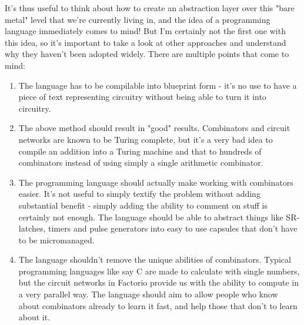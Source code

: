 \documentclass[landscape]{article}
\theoremstyle{plain}
\theoremstyle{definition}
\begin{document}
It's thus useful to think about how to create an abstraction layer over this "bare metal" level that we're currently living in, and the idea of a programming language immediately comes to mind! But I'm certainly not the first one with this idea, so it's important to take a look at other approaches and understand why they haven't been adopted widely. There are multiple points that come to mind:
\begin{enumerate}
	\item The language has to be compilable into blueprint form - it's no use to have a piece of text representing circuitry without being able to turn it into circuitry.
	\item The above method should result in "good" results. Combinators and circuit networks are known to be Turing complete, but it's a very bad idea to compile an addition into a Turing machine and that to hundreds of combinators instead of using simply a single arithmetic combinator.
	\item The programming language should actually make working with combinators easier. It's not useful to simply textify the problem without adding substantial benefit - simply adding the ability to comment on stuff is certainly not enough. The language should be able to abstract things like SR-latches, timers and pulse generators into easy to use capsules that don't have to be micromanaged.
	\item The language shouldn't remove the unique abilities of combinators. Typical programming languages like say C are made to calculate with single numbers, but the circuit networks in Factorio provide us with the ability to compute in a very parallel way. The language should aim to allow people who know about combinators already to learn it fast, and help those that don't to learn about it.
\end{enumerate}
\end{document}
